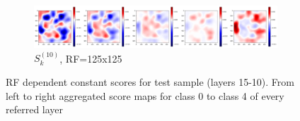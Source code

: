 \documentclass[preprint]{elsarticle}
\theoremstyle{definition} %
\theoremstyle{remark}
\begin{document}
\begin{figure}[h!]
	\begin{subfigure}[b]{\textwidth}
		\includegraphics[width=\textwidth]{figures/score_prop_23713_left/score_k125.png}
		\caption{$S_k^{(10)}$, RF=125x125}
		\label{fig:score_k125}
	\end{subfigure}

	\caption{RF dependent constant scores for test sample (layers 15-10). From left to right aggregated score maps for class 0 to class 4 of every referred layer}
	\label{fig:test1_score_explanation_k}
\end{figure}
\end{document}
